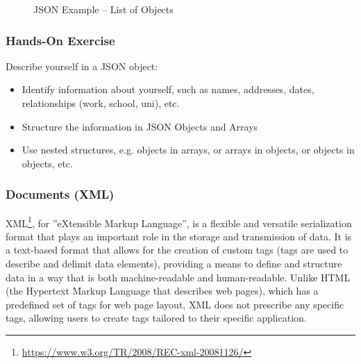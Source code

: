 \begin{figure}
\begin{jsoncode}
\end{jsoncode}
\caption{JSON Example -- List of Objects}
\label{fig:jason2}
\end{figure}

\begin{tcolorbox}[colback=code]
\subsubsection*{Hands-On Exercise} 

Describe yourself in a JSON object:
\begin{itemize}
	\item Identify information about yourself, such as names, addresses, dates, relationships (work, school, uni), etc.
	\item Structure the information in JSON Objects and Arrays 
	\item Use nested structures, e.g. objects in arrays, or arrays in objects, or objects in objects, etc.
\end{itemize}
\end{tcolorbox}

\subsubsection*{Documents (XML)}

XML\footnote{\url{https://www.w3.org/TR/2008/REC-xml-20081126/}}, for ''eXtensible Markup Language'', is a flexible and versatile serialization format that plays an important role in the storage and transmission of data. It is a text-based format that allows for the creation of custom tags (tags are used to describe and delimit data elements), providing a means to define and structure data in a way that is both machine-readable and human-readable. Unlike HTML (the Hypertext Markup Language that describes web pages), which has a predefined set of tags for web page layout, XML does not prescribe any specific tags, allowing users to create tags tailored to their specific application.

